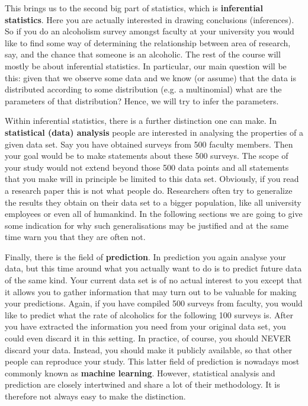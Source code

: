This brings us to the second big part of statistics, which is \textbf{inferential statistics}. Here you are actually interested in drawing
conclusions (inferences). So if you do an alcoholism survey amongst faculty at your university you would like to find some
way of determining the relationship between area of research, say, and the chance that someone is an alcoholic. The rest of the
course will mostly be about inferential statistics. In particular, our main question will be this: given that we observe some data and
we know (or assume) that the data is distributed according to some distribution (e.g. a multinomial) what are the parameters of that distribution? Hence, we will try to infer the parameters.

Within inferential statistics, there is a further distinction one can make. In \textbf{statistical (data) analysis} people are interested in analysing
the properties of a given data set. Say you have obtained surveys from 500 faculty members. Then your goal would be to make
statements about these 500 surveys. The scope of your study would not extend beyond those 500 data points and all statements that you make
will in principle be limited to this data set. Obviously, if you read a research paper this is not what people do. Researchers
often try to generalize the results they obtain on their data set to a bigger population, like all university employees or even
all of humankind. In the following sections we are going to give some indication for why such generalisations may be justified and
at the same time warn you that they are often not.

Finally, there is the field of \textbf{prediction}. In prediction you again analyse your data, but this time around what you actually want to
do is to predict future data of the same kind. Your current data set is of no actual interest to you except that it allows you
to gather information that may turn out to be valuable for making your predictions. Again, if you have compiled 500 surveys from 
faculty, you would like to predict what the rate of alcoholics for the following 100 surveys is. After you have extracted
the information you need from your original data set, you could even discard it in this setting. In practice, of course, you 
should NEVER discard your data. Instead, you should make it publicly available, so that other people can reproduce your study.
This latter field of prediction is nowadays most commonly known as \textbf{machine learning}. However, statistical analysis and 
prediction are closely intertwined and share a lot of their methodology. It is therefore not always easy to make the distinction.


